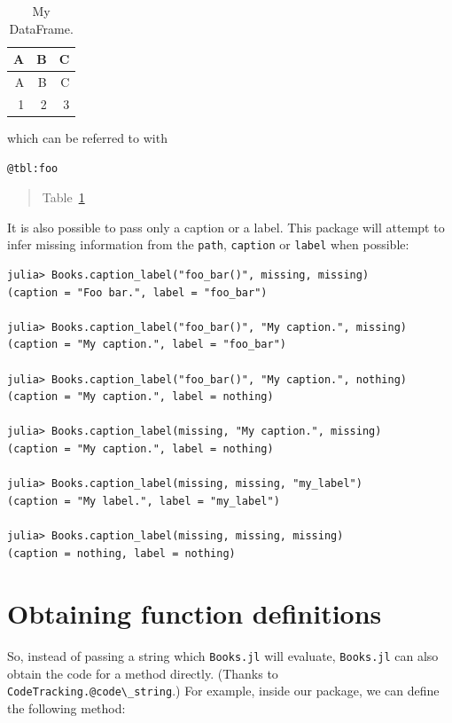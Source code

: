 \documentclass[
  notoc %
]{tufte-book}
\newcommand{\passthrough}[1]{#1}
\begin{document}
\hypertarget{tbl:foo}{}
\begin{longtable}[]{@{}rrr@{}}
\caption{\label{tbl:foo}My DataFrame.}\tabularnewline
\toprule
A & B & C \\
\midrule
\endfirsthead
\toprule
A & B & C \\
\midrule
\endhead
1 & 2 & 3 \\
\bottomrule
\end{longtable}

which can be referred to with

\begin{lstlisting}
@tbl:foo
\end{lstlisting}

\begin{quote}
Table~\ref{tbl:foo}
\end{quote}

It is also possible to pass only a caption or a label. This package will
attempt to infer missing information from the
\passthrough{\lstinline!path!}, \passthrough{\lstinline!caption!} or
\passthrough{\lstinline!label!} when possible:

\begin{lstlisting}[language=Output]
julia> Books.caption_label("foo_bar()", missing, missing)
(caption = "Foo bar.", label = "foo_bar")

julia> Books.caption_label("foo_bar()", "My caption.", missing)
(caption = "My caption.", label = "foo_bar")

julia> Books.caption_label("foo_bar()", "My caption.", nothing)
(caption = "My caption.", label = nothing)

julia> Books.caption_label(missing, "My caption.", missing)
(caption = "My caption.", label = nothing)

julia> Books.caption_label(missing, missing, "my_label")
(caption = "My label.", label = "my_label")

julia> Books.caption_label(missing, missing, missing)
(caption = nothing, label = nothing)
\end{lstlisting}

\hypertarget{sec:function_code_blocks}{%
\section{Obtaining function
definitions}\label{sec:function_code_blocks}}

So, instead of passing a string which \passthrough{\lstinline!Books.jl!}
will evaluate, \passthrough{\lstinline!Books.jl!} can also obtain the
code for a method directly. (Thanks to
\passthrough{\lstinline!CodeTracking.@code\_string!}.) For example,
inside our package, we can define the following method:
\end{document}
